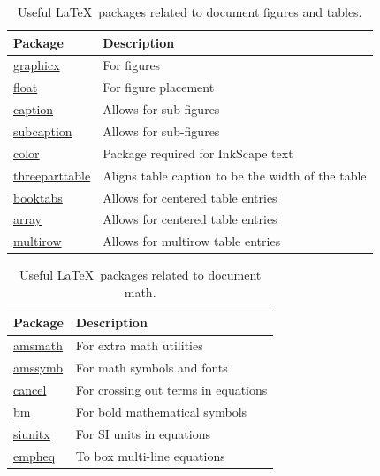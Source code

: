\begin{table}[hbt!]
	\centering
	\begin{threeparttable}[b]
		\caption{Useful \LaTeX\ packages related to document figures and tables.}
		\label{tab:usefulPackagesFiguresTables}
		\begin{tabular}{ll}
			\toprule
			\textbf{Package} & \textbf{Description} \\ \midrule
			\href{https://ctan.org/pkg/graphicx}{graphicx} & For figures \\
			\href{https://ctan.org/pkg/float}{float} & For figure placement \\
			\href{https://ctan.org/pkg/caption}{caption} & Allows for sub-figures \\
			\href{https://ctan.org/pkg/subcaption}{subcaption} & Allows for sub-figures \\
			\href{https://ctan.org/pkg/color}{color} & Package required for InkScape text \\
			\href{https://ctan.org/pkg/threeparttable}{threeparttable} & Aligns table caption to be the width of the table \\
			\href{https://ctan.org/pkg/booktabs}{booktabs} & Allows for centered table entries \\
			\href{https://ctan.org/pkg/array}{array} & Allows for centered table entries \\
			\href{https://ctan.org/pkg/multirow}{multirow} & Allows for multirow table entries \\
			\bottomrule
		\end{tabular}
	\end{threeparttable}
\end{table}


\begin{table}[hbt!]
	\centering
	\begin{threeparttable}[b]
		\caption{Useful \LaTeX\ packages related to document math.}
		\label{tab:usefulPackagesMath}
		\begin{tabular}{ll}
			\toprule
			\textbf{Package} & \textbf{Description} \\ 
			\midrule
			\href{https://ctan.org/pkg/amsmath}{amsmath} & For extra math utilities \\
			\href{https://ctan.org/pkg/amssymb}{amssymb} & For math symbols and fonts \\
			\href{https://ctan.org/pkg/cancel}{cancel} & For crossing out terms in equations \\
			\href{https://ctan.org/pkg/bm}{bm} & For bold mathematical symbols \\
			\href{https://ctan.org/pkg/siunitx}{siunitx} & For SI units in equations \\
			\href{https://ctan.org/pkg/empheq}{empheq} & To box multi-line equations \\ 
			\bottomrule
		\end{tabular}
	\end{threeparttable}
\end{table}


